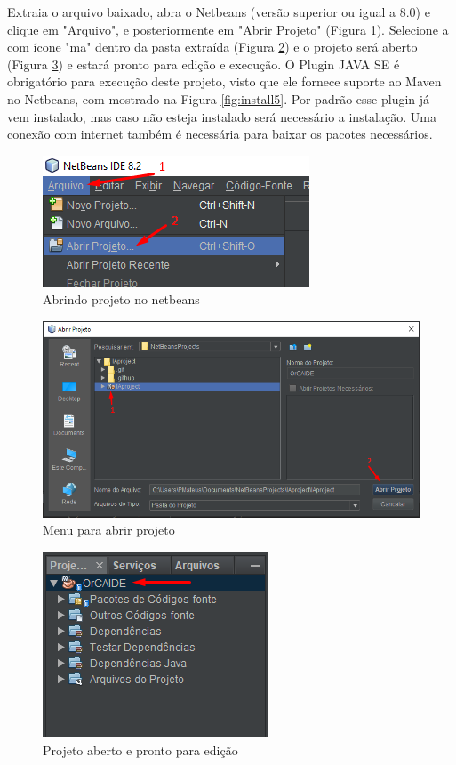 \documentclass{bcc}
\begin{document}
Extraia o arquivo baixado, abra o Netbeans (versão superior ou igual a 8.0) e clique em "Arquivo", e posteriormente em "Abrir Projeto" (Figura \ref{fig:install2}). Selecione a com ícone "ma" dentro da pasta extraída (Figura \ref{fig:install3}) e o projeto será aberto (Figura \ref{fig:install4}) e estará pronto para edição e execução. O Plugin JAVA SE é obrigatório para execução deste projeto, visto que ele fornece suporte ao Maven no Netbeans, com mostrado na Figura \ref{fig:install5}. Por padrão esse plugin já vem instalado, mas caso não esteja instalado será necessário a instalação. Uma conexão com internet também é necessária para baixar os pacotes necessários.

\begin{figure}[H]
\centering
\includegraphics[width=.7\textwidth]{Figuras/install2.png}
\caption{Abrindo projeto no netbeans} 
\label{fig:install2}
\end{figure}

\begin{figure}[H]
\centering
\includegraphics[width=.9\textwidth]{Figuras/install3.png}
\caption{Menu para abrir projeto} 
\label{fig:install3}
\end{figure}

\begin{figure}[H]
\centering
\includegraphics[width=.5\textwidth]{Figuras/install4.png}
\caption{Projeto aberto e pronto para edição} 
\label{fig:install4}
\end{figure}
\end{document}
